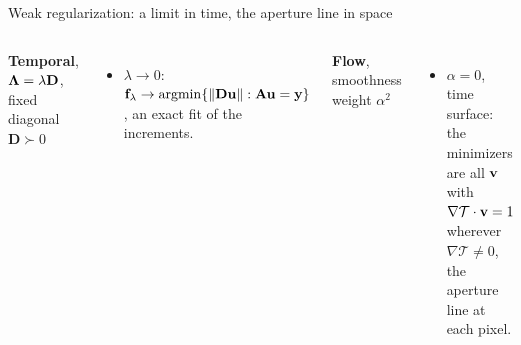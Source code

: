 \begin{frame}[t,label=weakreg]{Weak regularization: a limit in time, the aperture line in space}
\small
\begin{columns}[T]
\textbf{Temporal}, $\bm\Lambda=\lambda\mathbf D$, fixed diagonal $\mathbf D\succ0$
\begin{itemize}
\item $\lambda\to0$: $\mathbf f_\lambda\to\operatorname{argmin}\{\left\lVert\mathbf D\mathbf u\right\rVert:\mathbf A\mathbf u=\mathbf y\}$, an exact fit of the increments.
\end{itemize}
\textbf{Flow}, smoothness weight $\alpha^2$
\begin{itemize}
\item $\alpha=0$, time surface: the minimizers are all $\mathbf v$ with $\nabla\mathcal T\cdot\mathbf v=1$ wherever $\nabla\mathcal T\ne0$, the aperture line at each pixel.
\end{itemize}
\end{columns}

\end{frame}

